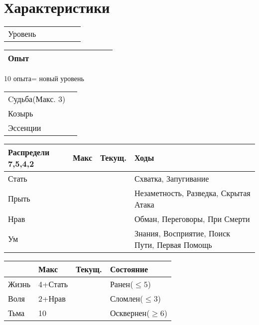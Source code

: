 \section*{Характеристики}

\begin{center}
  \begin{tabular}{l c}
     Уровень & \verb!        !\\ 
  \end{tabular}

\begin{tabular}{|l|c|c|c|c|c|c|c|c|c|c|}
  \hline
  Опыт & & & & & & & & & &\\ \hline
\end{tabular}

{\footnotesize 10 опыта= новый уровень}
\end{center}
\begin{tabular}{l c}
  Cудьба{\tiny(Макс. 3)} & \\
  Козырь & \\
  Эссенции & \\ 
\end{tabular}

\begin{center}
\begin{tabular}{|p{2cm}|p{1cm}|p{1cm}|p{3cm}|}
\hline
  Распредели 7,5,4,2 & Макс & Текущ. & Ходы \\ \hline
  Стать & & & {\footnotesize Схватка, Запугивание}\\ [5ex] \hline
  Прыть & & & {\footnotesize Незаметность, Разведка, Скрытая Атака}\\ \hline
  Нрав & & & {\footnotesize Обман, Переговоры, При Смерти}\\ [5ex] \hline
  Ум & & & {\footnotesize Знания, Восприятие, Поиск Пути, Первая Помощь} \\ \hline
\end{tabular}

\begin{tabular}{|p{1.5cm}|p{1.5cm}|p{1cm}|p{3cm}|}
  \hline
   & Макс & Текущ. & Состояние \\ \hline
  Жизнь & 4+Стать & & Ранен($\leq 5$) \\ \hline
  Воля & 2+Нрав & & Сломлен($\leq 3$) \\ \hline
  Тьма & 10  & &  Осквернен($\geq 6$) \\ \hline
\end{tabular}

\end{center}

\pagebreak